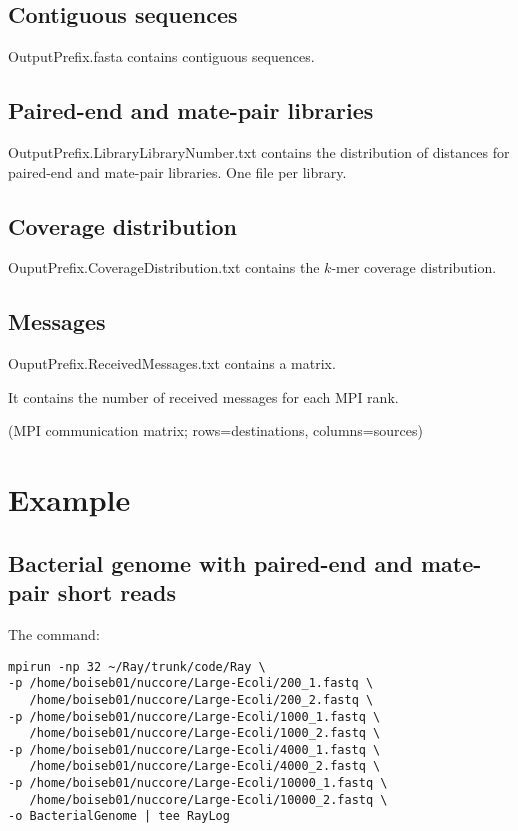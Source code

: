 \documentclass{article}
\begin{document}
\subsection{Contiguous sequences}

OutputPrefix.fasta contains contiguous sequences.

\subsection{Paired-end and mate-pair libraries}

OutputPrefix.LibraryLibraryNumber.txt contains the distribution of distances for paired-end and mate-pair libraries. One file per library.

\subsection{Coverage distribution}

OuputPrefix.CoverageDistribution.txt contains the $k$-mer coverage distribution.

\subsection{Messages}

OuputPrefix.ReceivedMessages.txt contains a matrix.

It contains the number of received messages for each MPI rank.

(MPI communication matrix; rows=destinations, columns=sources)

\section{Example}

\subsection{Bacterial genome with paired-end and mate-pair short reads}

The command:

\begin{verbatim}
mpirun -np 32 ~/Ray/trunk/code/Ray \
-p /home/boiseb01/nuccore/Large-Ecoli/200_1.fastq \
   /home/boiseb01/nuccore/Large-Ecoli/200_2.fastq \
-p /home/boiseb01/nuccore/Large-Ecoli/1000_1.fastq \
   /home/boiseb01/nuccore/Large-Ecoli/1000_2.fastq \
-p /home/boiseb01/nuccore/Large-Ecoli/4000_1.fastq \
   /home/boiseb01/nuccore/Large-Ecoli/4000_2.fastq \
-p /home/boiseb01/nuccore/Large-Ecoli/10000_1.fastq \
   /home/boiseb01/nuccore/Large-Ecoli/10000_2.fastq \
-o BacterialGenome | tee RayLog
\end{verbatim}
\end{document}
